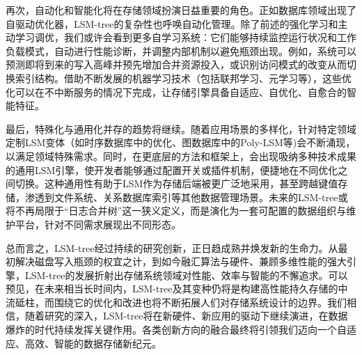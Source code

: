 \documentclass[lang=cn,11pt,a4paper]{elegantpaper}
\begin{document}
再次，自动化和智能化将在存储领域扮演日益重要的角色。正如数据库领域出现了自驱动优化器，LSM-tree的复杂性也呼唤自动化管理。除了前述的强化学习和主动学习调优，我们或许会看到更多自学习系统：它们能够持续监控运行状况和工作负载模式，自动进行性能诊断，并调整内部机制以避免瓶颈出现。例如，系统可以预测即将到来的写入高峰并预先增加合并资源投入，或识别访问模式的改变从而切换索引结构。借助不断发展的机器学习技术（包括联邦学习、元学习等），这些优化可以在不中断服务的情况下完成，让存储引擎具备自适应、自优化、自愈合的智能特征。 

最后，特殊化与通用化并存的趋势将继续。随着应用场景的多样化，针对特定领域定制LSM变体（如时序数据库中的优化、图数据库中的Poly-LSM等)会不断涌现，以满足领域特殊需求。同时，在更底层的方法和框架上，会出现吸纳多种技术成果的通用LSM引擎，使开发者能够通过配置开关或插件机制，便捷地在不同优化之间切换。这种通用性有助于LSM作为存储后端被更广泛地采用，甚至跨越键值存储，渗透到文件系统、关系数据库索引等其他数据管理场景。未来的LSM-tree或将不再局限于“日志合并树”这一狭义定义，而是演化为一套可配置的数据组织与维护平台，针对不同需求展现出不同形态。 

总而言之，LSM-tree经过持续的研究创新，正日趋成熟并焕发新的生命力。从最初解决磁盘写入瓶颈的权宜之计，到如今融汇算法与硬件、兼顾多维性能的强大引擎，LSM-tree的发展折射出存储系统领域对性能、效率与智能的不懈追求。可以预见，在未来相当长时间内，LSM-tree及其变种仍将是构建高性能持久存储的中流砥柱，而围绕它的优化和改进也将不断拓展人们对存储系统设计的边界。我们相信，随着研究的深入，LSM-tree将在新硬件、新应用的驱动下继续演进，在数据爆炸的时代持续发挥关键作用。各类创新方向的融合最终将引领我们迈向一个自适应、高效、智能的数据存储新纪元。
\end{document}
